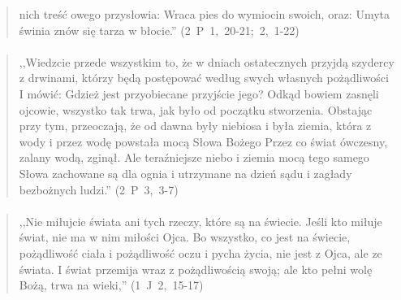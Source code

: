 \documentclass[10pt,a4paper,oneside]{article}
\begin{document}
\begin{quote}
nich treść owego przysłowia: Wraca pies do wymiocin swoich, oraz: Umyta świnia znów się tarza w błocie.'' \mbox{(2 P 1, 20-21; 2, 1-22)}
\end{quote}
\paragraph{}
\begin{quote}
,,Wiedzcie przede wszystkim to, że w dniach ostatecznych przyjdą szydercy z drwinami, którzy będą postępować według swych własnych pożądliwości I mówić: Gdzież jest przyobiecane przyjście jego? Odkąd bowiem zasnęli ojcowie, wszystko tak trwa, jak było od początku stworzenia. Obstając przy tym, przeoczają, że od dawna były niebiosa i była ziemia, która z wody i przez wodę powstała mocą Słowa Bożego Przez co świat ówczesny, zalany wodą, zginął. Ale teraźniejsze niebo i ziemia mocą tego samego Słowa zachowane są dla ognia i utrzymane na dzień sądu i zagłady bezbożnych ludzi.'' \mbox{(2 P 3, 3-7)}
\end{quote}
\paragraph{}
\begin{quote}
,,Nie miłujcie świata ani tych rzeczy, które są na świecie. Jeśli kto miłuje świat, nie ma w nim miłości Ojca. Bo wszystko, co jest na świecie, pożądliwość ciała i pożądliwość oczu i pycha życia, nie jest z Ojca, ale ze świata. I świat przemija wraz z pożądliwością swoją; ale kto pełni wolę Bożą, trwa na wieki,'' \mbox{(1 J 2, 15-17)}
\end{quote}
\end{document}
